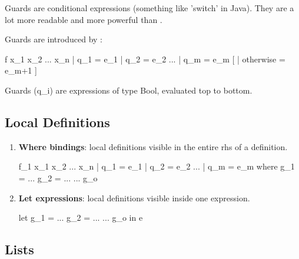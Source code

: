Guards are conditional expressions (something like 'switch' in Java).
They are a lot more readable and more powerful than .

Guards are introduced by \codeline{|}:
\begin{codebox}[haskell]
f x_1 x_2 ... x_n
  | q_1     = e_1
  | q_2     = e_2
  ...
  | q_m     = e_m
[ | otherwise   = e_m+1 ]
\end{codebox}

Guards (q\_i) are expressions of type Bool, evaluated top to bottom.




\subsection{Local Definitions}

\begin{enumerate}
  \item \textbf{Where bindings}: local definitions visible in the entire rhs of a definition.\\
  \begin{codebox}[haskell]
f_1 x_1 x_2 ... x_n | q_1 = e_1
                    | q_2 = e_2 
                    ...
                    | q_m = e_m 
          where 
              g_1 = ...
              g_2 = ...
              ...
              g_o
  \end{codebox}


  \item \textbf{Let expressions}: local definitions visible inside one expression.\\
  \begin{codebox}[haskell]
let g_1 = ...
    g_2 = ...
    ...
    g_o
in e
  \end{codebox}
\end{enumerate}


\subsection{Lists}

